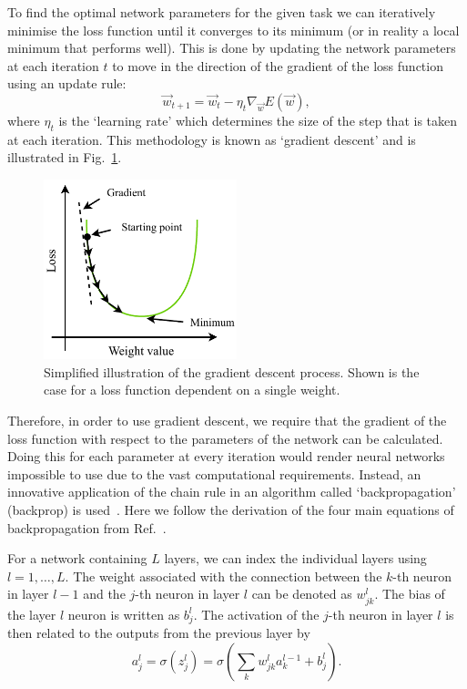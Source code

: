 To find the optimal network parameters for the given task we can iteratively minimise the loss
function until it converges to its minimum (or in reality a local minimum that performs well).
This is done by updating the network parameters at each iteration $t$ to move in the direction of
the gradient of the loss function using an update rule:
\begin{equation} %
    \vec{w}_{t+1}=\vec{w}_{t}-\eta_{t}\nabla_{\vec{w}}E(\vec{w}),
\end{equation}
where $\eta_{t}$ is the `learning rate' which determines the size of the step that is taken at
each iteration. This methodology is known as `gradient descent' and is illustrated in
Fig.~\ref{fig:gradient_descent}.

\begin{figure} %
    \includegraphics[width=0.5\textwidth]{diagrams/6-cvn/gradient_descent.pdf}
    \caption[Illustration of the gradient descent process.]
    {Simplified illustration of the gradient descent process. Shown is the case for a loss
        function dependent on a single weight.}
    \label{fig:gradient_descent}
\end{figure}

Therefore, in order to use gradient descent, we require that the gradient of the loss function
with respect to the parameters of the network can be calculated. Doing this for each parameter at
every iteration would render neural networks impossible to use due to the vast computational
requirements. Instead, an innovative application of the chain rule in an algorithm called
`backpropagation' (backprop) is used~\cite{werbos1974}. Here we follow the derivation of the four
main equations of backpropagation from Ref.~\cite{mehta2019}.

For a network containing $L$ layers, we can index the individual layers using $l=1,\dots,L$. The
weight associated with the connection between the $k$-th neuron in layer $l-1$ and the $j$-th
neuron in layer $l$ can be denoted as $w^{l}_{jk}$. The bias of the layer $l$ neuron is written as
$b^{l}_{j}$. The activation of the $j$-th neuron in layer $l$ is then related to the outputs from
the previous layer by
\begin{equation} %
    a^{l}_{j}=\sigma(z^{l}_{j})=\sigma\left(\sum_{k}w^{l}_{jk}a^{l-1}_{k}+b^{l}_{j}\right).
    \label{eq:feedforward}
\end{equation}

